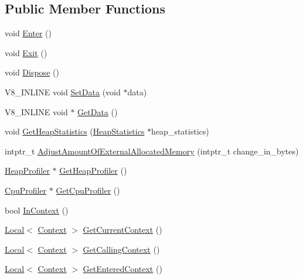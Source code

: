 \subsection*{Public Member Functions}
\begin{DoxyCompactItemize}
\item 
void \hyperlink{classv8_1_1_isolate_aec80bb49b6b7647ff75e8f2cc9484ea3}{Enter} ()
\item 
void \hyperlink{classv8_1_1_isolate_a64a8503cafd00d1d2cadfbb0c2345054}{Exit} ()
\item 
void \hyperlink{classv8_1_1_isolate_a1a5a5762e4221aff8c6b10f9e3cec0af}{Dispose} ()
\item 
V8\+\_\+\+I\+N\+L\+I\+N\+E void \hyperlink{classv8_1_1_isolate_a57e22868fac4e090f05d23e432e2c771}{Set\+Data} (void $\ast$data)
\item 
V8\+\_\+\+I\+N\+L\+I\+N\+E void $\ast$ \hyperlink{classv8_1_1_isolate_a83c4ff274f359aa9582b15f300269b58}{Get\+Data} ()
\item 
void \hyperlink{classv8_1_1_isolate_add32e78544edaf8946ed9b328167e5e4}{Get\+Heap\+Statistics} (\hyperlink{classv8_1_1_heap_statistics}{Heap\+Statistics} $\ast$heap\+\_\+statistics)
\item 
intptr\+\_\+t \hyperlink{classv8_1_1_isolate_af59797f9f30d2712b431f1fba8aa599f}{Adjust\+Amount\+Of\+External\+Allocated\+Memory} (intptr\+\_\+t change\+\_\+in\+\_\+bytes)
\item 
\hyperlink{classv8_1_1_heap_profiler}{Heap\+Profiler} $\ast$ \hyperlink{classv8_1_1_isolate_a9c48259615e8370f6f0efd27cd7f99a6}{Get\+Heap\+Profiler} ()
\item 
\hyperlink{classv8_1_1_cpu_profiler}{Cpu\+Profiler} $\ast$ \hyperlink{classv8_1_1_isolate_a7eb415d9210d912aa57877ab6416fec8}{Get\+Cpu\+Profiler} ()
\item 
bool \hyperlink{classv8_1_1_isolate_afb6bbd31a87d0999dbbe5402447690a9}{In\+Context} ()
\item 
\hyperlink{classv8_1_1_local}{Local}$<$ \hyperlink{classv8_1_1_context}{Context} $>$ \hyperlink{classv8_1_1_isolate_afa1b6cde5a7a7cfde87eaabc4ab34062}{Get\+Current\+Context} ()
\item 
\hyperlink{classv8_1_1_local}{Local}$<$ \hyperlink{classv8_1_1_context}{Context} $>$ \hyperlink{classv8_1_1_isolate_a2fba719b7a022ece0b0bfe55f52b3138}{Get\+Calling\+Context} ()
\item 
\hyperlink{classv8_1_1_local}{Local}$<$ \hyperlink{classv8_1_1_context}{Context} $>$ \hyperlink{classv8_1_1_isolate_aff9eb2f5d199f8fcf59d9699194cd2e3}{Get\+Entered\+Context} ()

\end{DoxyCompactItemize}
